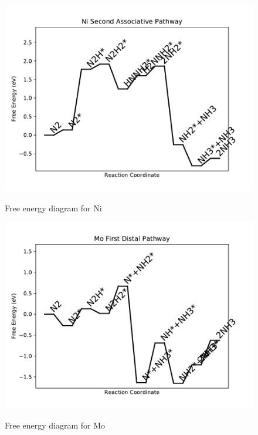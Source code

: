 \documentclass{article}
\begin{document}
\begin{figure}
\includegraphics[width=1\linewidth]{data/plots/Ni_associative_2.pdf}
\label{fig:Ni_associative_2}
\caption{Free energy diagram for Ni}
\end{figure}

\begin{figure}
\includegraphics[width=1\linewidth]{data/plots/Mo_distal_1.pdf}
\label{fig:Mo_distal_1}
\caption{Free energy diagram for Mo}
\end{figure}
\end{document}
